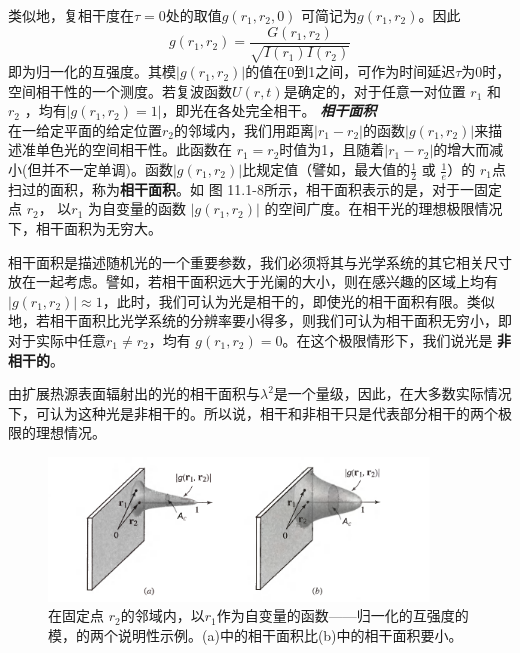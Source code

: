 \documentclass[UTF8]{ctexart}
\numberwithin{figure}{subsection}
\numberwithin{table}{subsection}
\begin{document}
\par 类似地，复相干度在$ \tau = 0 $处的取值$ g(r_1, r_2, 0) $ 可简记为$ g(r_1, r_2) $。因此
\begin{equation}
g(r_1, r_2) = \frac{G(r_1, r_2)}{\sqrt{I(r_1) I(r_2)}}
\end{equation}
即为归一化的互强度。其模$ \lvert g(r_1, r_2) \rvert $的值在0到1之间，可作为时间延迟$ \tau $为0时，空间相干性的一个测度。若复波函数$ U(r, t) $是确定的，对于任意一对位置 $ r_1 $ 和 $ r_2 $ ，均有$ \lvert g(r_1, r_2) = 1\rvert $，即光在各处完全相干。
\bigbreak\noindent\textcolor{ksc}{\textbf{\textsl{相干面积}}}\\
在一给定平面的给定位置$ r_2 $的邻域内，我们用距离$ \lvert r_1 - r_2 \rvert $的函数$ \lvert g(r_1, r_2) \rvert $来描述准单色光的空间相干性。此函数在 $ r_1 = r_2 $时值为1，且随着$ \lvert r_1 - r_2 \rvert $的增大而减小(但并不一定单调)。函数$ \lvert g(r_1, r_2) \rvert $比规定值（譬如，最大值的$ \frac{1}{2} $ 或 $ \frac{1}{e} $）的 $ r_1 $点扫过的面积，称为\textbf{相干面积}。如 图 11.1-8所示，相干面积表示的是，对于一固定点 $ r_2 $， 以$ r_1 $ 为自变量的函数 $ \lvert g(r_1, r_2) \rvert $ 的空间广度。在相干光的理想极限情况下，相干面积为无穷大。
\par 相干面积是描述随机光的一个重要参数，我们必须将其与光学系统的其它相关尺寸放在一起考虑。譬如，若相干面积远大于光阑的大小，则在感兴趣的区域上均有$ \lvert g(r_1, r_2) \rvert \approx 1 $，此时，我们可认为光是相干的，即使光的相干面积有限。类似地，若相干面积比光学系统的分辨率要小得多，则我们可认为相干面积无穷小，即对于实际中任意$ r_1 \neq r_2 $，均有 $ g(r_1, r_2) = 0 $。在这个极限情形下，我们说光是 \textbf{非相干的}。
\par 由扩展热源表面辐射出的光的相干面积与$ \lambda^2 $是一个量级，因此，在大多数实际情况下，可认为这种光是非相干的。所以说，相干和非相干只是代表部分相干的两个极限的理想情况。
 \begin{figure}[H]
\centering
\includegraphics[width=0.9\textwidth]{11_1_8.PNG}
\caption{在固定点 $ r_2 $的邻域内，以$ r_1 $作为自变量的函数——归一化的互强度的模，的两个说明性示例。(a)中的相干面积比(b)中的相干面积要小。}
\label{fig: 11_1_8}
\end{figure}
\end{document}
